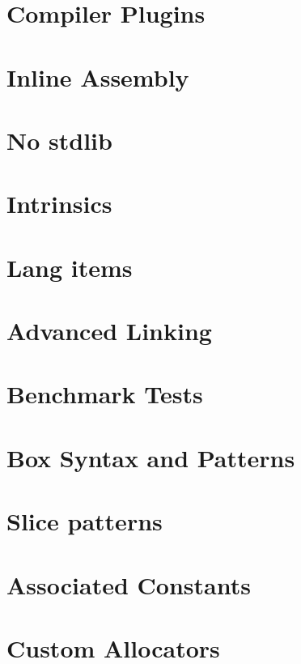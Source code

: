 \section{Compiler Plugins}
\label{sec:nightly_compilerPlugins}


\section{Inline Assembly}
\label{sec:nightly_inlineAssembly}


\section{No stdlib}
\label{sec:nightly_nostdlib}


\section{Intrinsics}
\label{sec:nightly_intrinsics}


\section{Lang items}
\label{sec:nightly_langItems}


\section{Advanced Linking}
\label{sec:nightly_advancedLinking}


\section{Benchmark Tests}
\label{sec:nightly_benchmarkTests}


\section{Box Syntax and Patterns}
\label{sec:nightly_boxSyntaxAndPatterns}


\section{Slice patterns}
\label{sec:nightly_slicePatterns}


\section{Associated Constants}
\label{sec:nightly_associatedConstants}


\section{Custom Allocators}
\label{sec:nightly_customAllocators}

